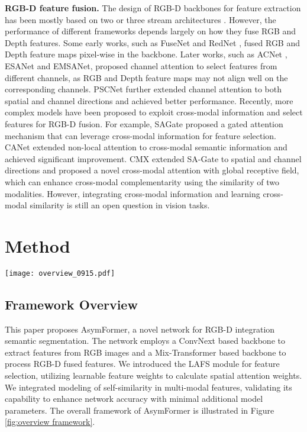 \documentclass[letterpaper, 10 pt, conference]{ieeeconf}
\begin{document}
\textbf{RGB-D feature fusion.} The design of RGB-D backbones for feature extraction has been mostly based on two or three stream architectures \cite{liu2022cmx}. However, the performance of different frameworks depends largely on how they fuse RGB and Depth features. Some early works, such as FuseNet\cite{hazirbas2017fusenet} and RedNet \cite{jiang2018rednet}, fused RGB and Depth feature maps pixel-wise in the backbone. Later works, such as ACNet \cite{hu2019acnet}, ESANet \cite{seichter2021efficient} and EMSANet\cite{seichter2022efficient}, proposed channel attention to select features from different channels, as RGB and Depth feature maps may not align well on the corresponding channels. PSCNet \cite{du2022pscnet} further extended channel attention to both spatial and channel directions and achieved better performance. Recently, more complex models have been proposed to exploit cross-modal information and select features for RGB-D fusion. For example, SAGate \cite{chen2020bi} proposed a gated attention mechanism that can leverage cross-modal information for feature selection. CANet \cite{zhou2022canet} extended non-local attention \cite{wang2018non} to cross-modal semantic information and achieved significant improvement. CMX \cite{liu2022cmx} extended SA-Gate to spatial and channel directions and proposed a novel cross-modal attention with global receptive field, which can enhance cross-modal complementarity using the similarity of two modalities. However, integrating cross-modal information and learning cross-modal similarity is still an open question in vision tasks.



\section{Method}

\begin{figure*}[htbp]
\vspace {+0.6em}
\centering
\texttt{[image: overview\_0915.pdf]}
\caption{\label{fig:overview framework}Overview of AsymFormer.}
\vspace {-1.1em}
\end{figure*}


\subsection{Framework Overview}
This paper proposes AsymFormer, a novel network for RGB-D integration semantic segmentation. The network employs a ConvNext \cite{liu2022convnet} based backbone to extract features from RGB images and a Mix-Transformer \cite{xie2021segformer} based backbone to process RGB-D fused features. We introduced the LAFS module for feature selection, utilizing learnable feature weights to calculate spatial attention weights. We integrated modeling of self-similarity in multi-modal features, validating its capability to enhance network accuracy with minimal additional model parameters. The overall framework of AsymFormer is illustrated in Figure \ref{fig:overview framework}.
\end{document}
